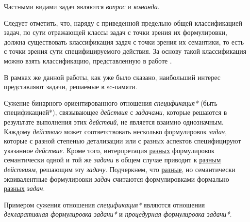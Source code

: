 Частными видами задач являются \textit{вопрос} и \textit{команда}.

\begin{SCn}
	\begin{scnindent}
	\end{scnindent}

\end{SCn}


Следует отметить, что, наряду с приведенной предельно общей классификацией задач, по сути отражающей классы задач с точки зрения их формулировки, должна существовать классификация задач с точки зрения их семантики, то есть с точки зрения сути специфицируемого действия. За основу такой классификация можно взять классификацию, представленную в работе .

В рамках же данной работы, как уже было сказано, наибольший интерес представляют задачи, решаемые в sc-памяти.

Сужение бинарного ориентированного отношения \textit{спецификация*} (быть спецификацией*), связывающее \textit{действия} с \textit{задачами}, которые решаются в результате выполнения этих \textit{действий}, не является взаимно однозначным.
Каждому \textit{действию} может соответствовать несколько формулировок \textit{задач}, которые с разной степенью детализации или с разных аспектов специфицируют указанное \textit{действие}.
Кроме того, интерпретация \uline{разных} формулировок семантически одной и той же \textit{задачи} в общем случае приводит к \uline{разным} \textit{действиям}, решающим эту \textit{задачу}.
Подчеркнем, что \uline{разные}, но семантически эквивалентные формулировки \textit{задач} считаются формулировками формально \uline{разных} \textit{задач}.

Примером сужения отношения \textit{спецификация*} являются отношения \textit{декларативная формулировка задачи*} и \textit{процедурная формулировка задачи*}.

